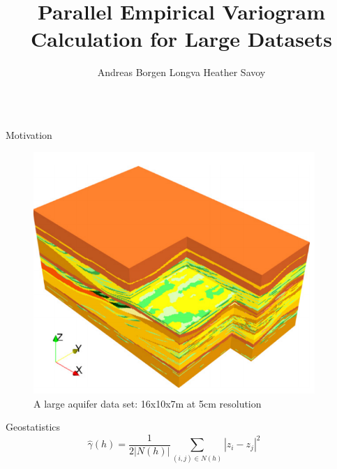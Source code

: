 \documentclass[serif,mathserif,final]{beamer}
\title{Parallel Empirical Variogram Calculation for Large Datasets}
\author{Andreas Borgen Longva \quad Heather Savoy}
\institute{University of California, Berkeley}
\begin{document}
\begin{frame}{}
  \begin{columns}[t]

    \begin{column}{0.32\linewidth}

      \begin{block}{Motivation}
         \begin{figure}[htbp]
            \centering
            \includegraphics{herten.png} %
            \caption{A large aquifer data set: 16x10x7m at 5cm resolution \cite{Comunian2011a}}
            \label{fig:example}
         \end{figure}
      \end{block}

      \begin{block}{Geostatistics}
        \begin{equation*}
		\hat{\gamma}(h)=\frac{1}{2|N(h)|}\sum_{(i,j)\in N(h)} |z_i-z_j|^2
	\end{equation*}
      \end{block}


    \end{column}%

    \begin{column}{0.32\linewidth}


\end{column}
\end{columns}
\end{frame}
\end{document}
